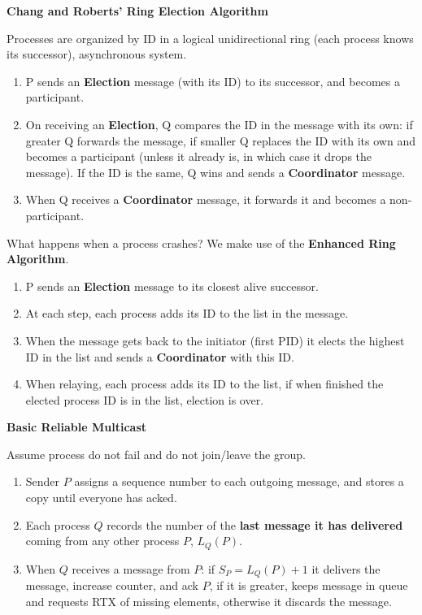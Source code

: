 \documentclass[a4paper, 10pt, twocolumn]{article}
\begin{document}
    \textbf{Chang and Roberts' Ring Election Algorithm}

    Processes are organized by ID in a logical unidirectional ring (each process knows its successor), asynchronous system.
    \begin{enumerate}
        \item P sends an \textbf{Election} message (with its ID) to its successor, and becomes a participant.
        \item On receiving an \textbf{Election}, Q compares the ID in the message with its own: if greater Q forwards the message, if smaller Q replaces the ID with its own and becomes a participant (unless it already is, in which case it drops the message). If the ID is the same, Q wins and sends a \textbf{Coordinator} message.
        \item When Q receives a \textbf{Coordinator} message, it forwards it and becomes a non-participant.
    \end{enumerate}
    What happens when a process crashes? We make use of the \textbf{Enhanced Ring Algorithm}.
    \begin{enumerate}
        \item P sends an \textbf{Election} message to its closest alive successor.
        \item At each step, each process adds its ID to the list in the message.
        \item When the message gets back to the initiator (first PID) it elects the highest ID in the list and sends a \textbf{Coordinator} with this ID.
        \item When relaying, each process adds its ID to the list, if when finished the elected process ID is in the list, election is over.
    \end{enumerate}

    \textbf{Basic Reliable Multicast}

    Assume process do not fail and do not join/leave the group.
    \begin{enumerate}
        \item Sender $P$ assigns a sequence number to each outgoing message, and stores a copy until everyone has acked.
        \item Each process $Q$ records the number of the \textbf{last message it has delivered} coming from any other process $P$, $L_Q(P)$.
        \item When $Q$ receives a message from $P$: if $S_P = L_Q(P) + 1$ it delivers the message, increase counter, and ack $P$, if it is greater, keeps message in queue and requests RTX of missing elements, otherwise it discards the message.
    \end{enumerate}
\end{document}
